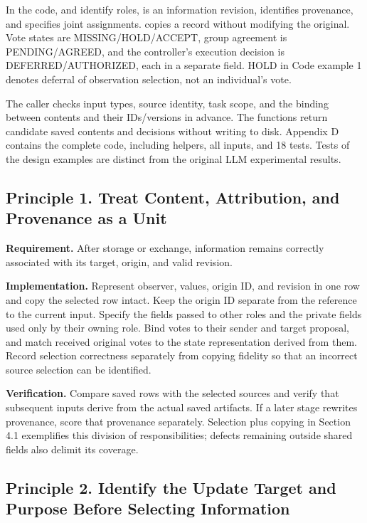 \documentclass[10pt,a4paper]{article}
\begin{document}
In the code, \texttt{} and \texttt{} identify roles, \texttt{} is an information revision, \texttt{} identifies provenance, and \texttt{} specifies joint assignments. \texttt{} copies a record without modifying the original. Vote states are MISSING/HOLD/ACCEPT, group agreement is PENDING/AGREED, and the controller's execution decision is DEFERRED/AUTHORIZED, each in a separate field. HOLD in Code example 1 denotes deferral of observation selection, not an individual's vote.

The caller checks input types, source identity, task scope, and the binding between contents and their IDs/versions in advance. The functions return candidate saved contents and decisions without writing to disk. Appendix D contains the complete code, including helpers, all inputs, and 18 tests. Tests of the design examples are distinct from the original LLM experimental results.

\subsection{Principle 1. Treat Content, Attribution, and Provenance as a Unit}\label{two-role-failure-design-principle-1.-treat-content-attribution-and-provenance-as-a-unit}

\textbf{Requirement.} After storage or exchange, information remains correctly associated with its target, origin, and valid revision.

\textbf{Implementation.} Represent observer, values, origin ID, and revision in one row and copy the selected row intact. Keep the origin ID separate from the reference to the current input. Specify the fields passed to other roles and the private fields used only by their owning role. Bind votes to their sender and target proposal, and match received original votes to the state representation derived from them. Record selection correctness separately from copying fidelity so that an incorrect source selection can be identified.

\textbf{Verification.} Compare saved rows with the selected sources and verify that subsequent inputs derive from the actual saved artifacts. If a later stage rewrites provenance, score that provenance separately. Selection plus copying in Section 4.1 exemplifies this division of responsibilities; defects remaining outside shared fields also delimit its coverage.

\subsection{Principle 2. Identify the Update Target and Purpose Before Selecting Information}\label{two-role-failure-design-principle-2.-identify-the-update-target-and-purpose-before-selecting-information}
\end{document}

